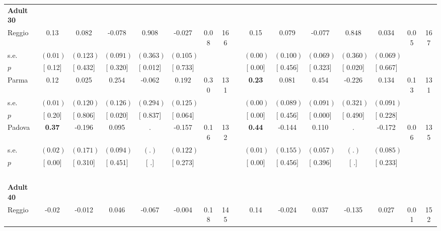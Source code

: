 \begin{longtable}{L{8em} c c c c c c c p{1em} c c c c c c c}
\quad \quad \textbf{Adult 30} & & & & & & & & & & & & & & & \\* 
\quad \quad \quad Reggio& 0.13 &     0.082 &    -0.078 & $ \mathbf{    0.908}$ &    -0.027 &      0.08 &       166 & & 0.15 &     0.079 &    -0.077 & $ \mathbf{    0.848}$ &     0.034 &      0.05 &       167  \\*
\quad \quad \quad \quad s.e.& $ (     0.01)$ & $ (    0.123)$ & $ (    0.091)$ & $ (    0.363)$ & $ (    0.105)$ & & & & $ (     0.00)$ & $ (    0.100)$ & $ (    0.069)$ & $ (    0.360)$ & $ (    0.069)$ & &  \\*
\quad \quad \quad \quad $ p$ & [     0.12] & [    0.432] & [    0.320] & [    0.012] & [    0.733] & & & & [     0.00] & [    0.456] & [    0.323] & [    0.020] & [    0.667] & &  \\[1em]
\quad \quad \quad Parma& 0.12 &     0.025 & $ \mathbf{    0.254}$ &    -0.062 & $ \mathbf{    0.192}$ &      0.30 &       131 & & \textbf{     0.23} &     0.081 & $ \mathbf{    0.454}$ &    -0.226 &     0.134 &      0.13 &       131  \\*
\quad \quad \quad \quad s.e.& $ (     0.01)$ & $ (    0.120)$ & $ (    0.126)$ & $ (    0.294)$ & $ (    0.125)$ & & & & $ (     0.00)$ & $ (    0.089)$ & $ (    0.091)$ & $ (    0.321)$ & $ (    0.091)$ & &  \\*
\quad \quad \quad \quad $ p$ & [     0.20] & [    0.806] & [    0.020] & [    0.837] & [    0.064] & & & & [     0.00] & [    0.456] & [    0.000] & [    0.490] & [    0.228] & &  \\[1em]
\quad \quad \quad Padova& \textbf{     0.37} &    -0.196 &     0.095 &         . &    -0.157 &      0.16 &       132 & & \textbf{     0.44} &    -0.144 &     0.110 &         . &    -0.172 &      0.06 &       135  \\*
\quad \quad \quad \quad s.e.& $ (     0.02)$ & $ (    0.171)$ & $ (    0.094)$ & $ (        .)$ & $ (    0.122)$ & & & & $ (     0.01)$ & $ (    0.155)$ & $ (    0.057)$ & $ (        .)$ & $ (    0.085)$ & &  \\*
\quad \quad \quad \quad $ p$ & [     0.00] & [    0.310] & [    0.451] & [        .] & [    0.273] & & & & [     0.00] & [    0.456] & [    0.396] & [        .] & [    0.233] & &  \\[1em]
~\\[1em]
\quad \quad \textbf{Adult 40} & & & & & & & & & & & & & & & \\* 
\quad \quad \quad Reggio& -0.02 &    -0.012 &     0.046 &    -0.067 &    -0.004 &      0.18 &       145 & & 0.14 &    -0.024 &     0.037 &    -0.135 &     0.027 &      0.01 &       152  \\*

\end{longtable}
